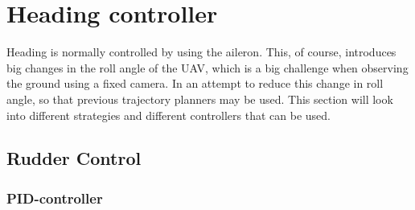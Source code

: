 \documentclass{article}
\begin{document}
\section{Heading controller}
Heading is normally controlled by using the aileron. This, of course, introduces big changes in the roll angle of the UAV, which is a big challenge when observing the ground using a fixed camera. In an attempt to reduce this change in roll angle, so that previous trajectory planners may be used. This section will look into different strategies and different controllers that can be used.

\subsection{Rudder Control}


\subsubsection{PID-controller}
\end{document}
